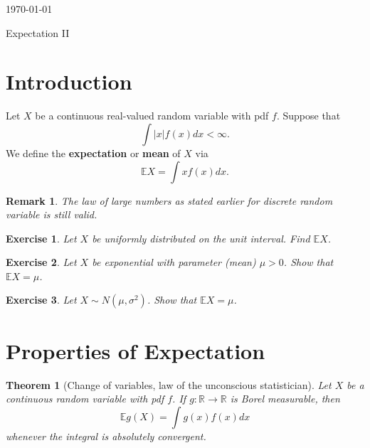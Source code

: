 \documentclass[12pt, reqno]{amsart}
\newtheorem{theorem}{Theorem}
\newtheorem{remark}{Remark}
\newtheorem{ex}{Exercise}[section]
\newcommand\dff[1]{\textbf{#1}}
\newcommand{\R}{{\mathbb R}}
\newcommand{\E}{{\mathbb E}}     %
\begin{document}
\today
\begin{title}
{Expectation II}
\end{title}
\maketitle{}

\begin{abstract}
We will define the expectation of a continuous random variable and discuss  basic properties.  
\end{abstract}


\section{Introduction}

Let $X$ be a continuous real-valued random variable with pdf $f$.  Suppose that 
$$\int |x| f(x)  dx< \infty.$$
We define the \dff{expectation} or \dff{mean} of $X$ via
$$ \E X = \int  xf(x)dx.$$
\begin{remark}
The law of large numbers as stated earlier for discrete random variable is still valid.  
\end{remark}

\begin{ex} 
 Let $X$ be uniformly distributed on the unit interval.  Find $\E X$.  

\end{ex}


\begin{ex}
\label{exp}
    Let $X$ be exponential with parameter (mean) $\mu >0$.  Show that $ \E X = \mu$.  

\end{ex}



\begin{ex} 
\label{norm}
  Let $X \sim N(\mu, \sigma^2)$.  Show that $\E X = \mu$.  

\end{ex}

\section{Properties of Expectation}

\begin{theorem}[Change of variables, law of the unconscious statistician]
\label{CV}
Let $X$ be a continuous random variable  with pdf  $f$.     If $g: \R\to \R$ is Borel measurable,  then 
	$$ \E g(X) = \int g(x)f(x) dx$$
	whenever the integral  is absolutely convergent.  
\end{theorem}
\end{document}
